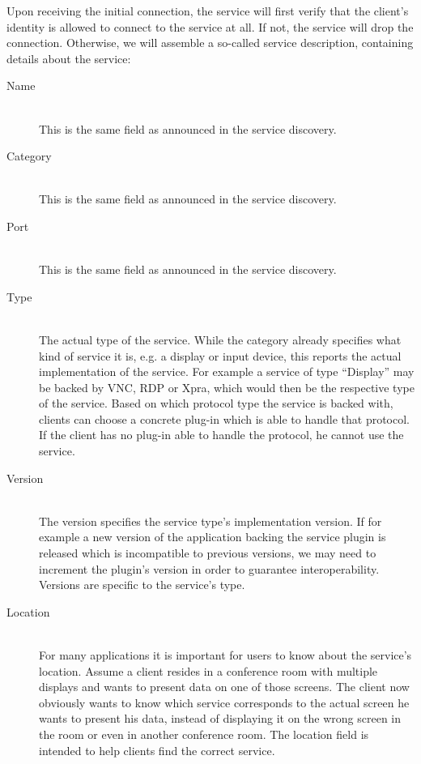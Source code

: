 Upon receiving the initial connection, the service will first verify that the client's identity is allowed to connect to the service at all.
If not, the service will drop the connection.
Otherwise, we will assemble a so-called service description, containing details about the service:
\begin{description}
    \item[Name]\hfill\\
        This is the same field as announced in the service discovery.
    \item[Category]\hfill\\
        This is the same field as announced in the service discovery.
    \item[Port]\hfill\\
        This is the same field as announced in the service discovery.
    \item[Type]\hfill\\
        The actual type of the service.
        While the category already specifies what kind of service it is, e.g. a display or input device, this reports the actual implementation of the service.
        For example a service of type ``Display'' may be backed by VNC, RDP or Xpra, which would then be the respective type of the service.
        Based on which protocol type the service is backed with, clients can choose a concrete plug-in which is able to handle that protocol.
        If the client has no plug-in able to handle the protocol, he cannot use the service.
    \item[Version]\hfill\\
        The version specifies the service type's implementation version.
        If for example a new version of the application backing the service plugin is released which is incompatible to previous versions, we may need to increment the plugin's version in order to guarantee interoperability.
        Versions are specific to the service's type.
    \item[Location]\hfill\\
        For many applications it is important for users to know about the service's location.
        Assume a client resides in a conference room with multiple displays and wants to present data on one of those screens.
        The client now obviously wants to know which service corresponds to the actual screen he wants to present his data, instead of displaying it on the wrong screen in the room or even in another conference room.
        The location field is intended to help clients find the correct service.

\end{description}
